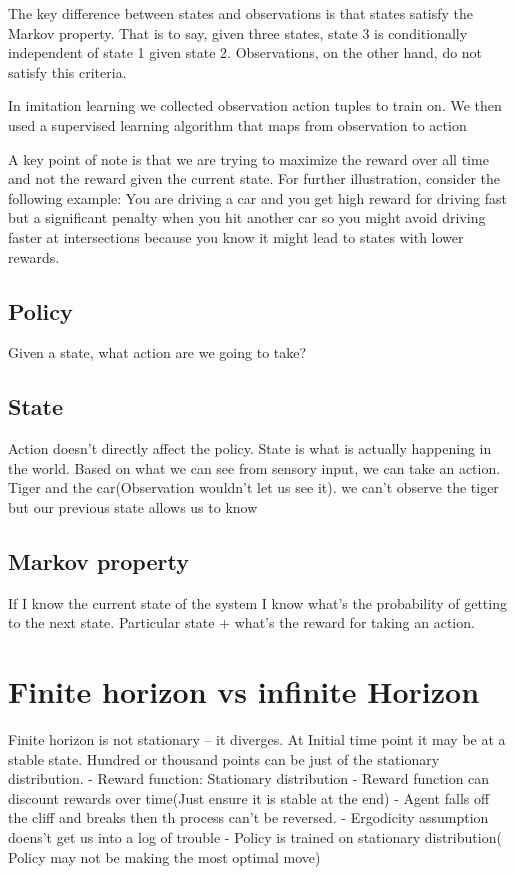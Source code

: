 \documentclass{article}
\begin{document}
The key difference between states and observations is that states satisfy the Markov property. That is to say, given three states, state 3 is conditionally independent of state 1 given state 2. Observations, on the other hand, do not satisfy this criteria.

In imitation learning we collected observation action tuples to train on. We then used a supervised learning algorithm that maps from observation to action


A key point of note is that we are trying to maximize the reward over all time and not the reward given the current state. For further illustration, consider the following example: You are driving a car and you get high reward for driving fast but a significant penalty when you hit another car so you might avoid driving faster at intersections because you know it might lead to states with lower rewards.




\subsection{Policy}
Given a state, what action are we going to take?

\subsection{State}
Action doesn't directly affect the policy. State is what is actually
happening in the world.  Based on what we can see from sensory input,
we can take an action.  Tiger and the car(Observation wouldn't let us
see it). we can't observe the tiger but our previous state allows us
to know

\subsection{Markov property}
If I know the current state of the system I know what's the
probability of getting to the next state. Particular state + what's
the reward for taking an action.

\section{Finite horizon vs infinite Horizon}
Finite horizon is not stationary -- it diverges.
At Initial time point it may be at a stable state. Hundred or thousand points can be just of the stationary distribution.
- Reward function: Stationary distribution
- Reward function can discount rewards over time(Just ensure it is stable at the end)
- Agent falls off the cliff and breaks then th process can't be reversed.
- Ergodicity assumption doens't get us into a log of trouble
- Policy is trained on stationary distribution( Policy may not be making the most optimal move)
\end{document}
